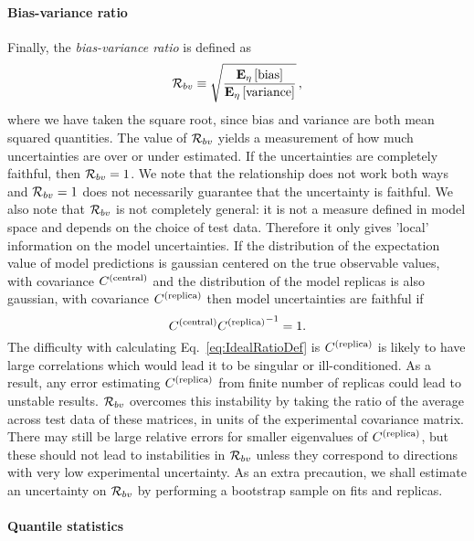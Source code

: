 \paragraph{Bias-variance ratio}

Finally, the {\em bias-variance ratio} is defined as
\begin{equation}
    \label{eq:RatioDef}
    \mathcal{R}_{bv} \equiv \sqrt{\frac{\mathbf{E}_{\eta}\left[ {\rm bias} \right]}{\mathbf{E}_{\eta}\left[ {\rm variance} \right]}}\, ,
\end{equation}
where we have taken the square root, since bias and variance are both mean
squared quantities. The value of $\mathcal{R}_{bv}$ yields a measurement of how
much uncertainties are over or under estimated. If the uncertainties are
completely faithful, then $\mathcal{R}_{bv} = 1$. We note that the relationship
does not work both ways and $\mathcal{R}_{bv} = 1$ does not necessarily guarantee
that the uncertainty is faithful. We also note that $\mathcal{R}_{bv}$ is not
completely general: it is not a measure defined in model space and depends on
the choice of test data. Therefore it only gives 'local' information on the
model uncertainties. If the distribution of the expectation value of model
predictions is gaussian centered on the true observable values, with covariance
$C^{(\rm central)}$ and the distribution of the model replicas is also gaussian, with
covariance $C^{(\rm replica)}$ then model uncertainties are faithful if
\begin{equation}\label{eq:IdealRatioDef}
    C^{(\rm central)} {C^{(\rm replica)}}^{-1} = 1.
\end{equation}
The difficulty with calculating Eq.~\ref{eq:IdealRatioDef} is $C^{(\rm replica)}$ is
likely to have large correlations which would lead it to be singular or
ill-conditioned. As a result, any error estimating $C^{(\rm replica)}$ from finite number
of replicas could lead to unstable results. $\mathcal{R}_{bv}$ overcomes this
instability by taking the ratio of the average across test data of these
matrices, in units of the experimental covariance matrix. There may still be
large relative errors for smaller eigenvalues of $C^{(\rm replica)}$, but these should not
lead to instabilities in $\mathcal{R}_{bv}$ unless they correspond to directions
with very low experimental uncertainty. As an extra precaution, we shall
estimate an uncertainty on $\mathcal{R}_{bv}$ by performing a bootstrap sample on
fits and replicas.

\paragraph{Quantile statistics}

